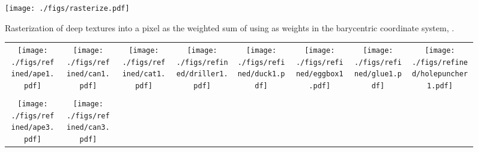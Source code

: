 \documentclass[10pt,twocolumn,letterpaper]{article}
\begin{document}
\begin{figure}[t]
  \centering
  \texttt{[image: ./figs/rasterize.pdf]}
  \caption{Rasterization of deep textures into a pixel  as the weighted sum of  using  as weights in the barycentric coordinate system, .}
  \label{fig:rasterize}
\end{figure}

\begin{figure*}
\begin{center}
\hspace*{-0.5cm}
\begin{tabular}{cccccccc}
  \begin{minipage}{0.10\linewidth}
    \texttt{[image: ./figs/refined/ape1.pdf]}
  \end{minipage} &
  \begin{minipage}{0.10\linewidth}
    \texttt{[image: ./figs/refined/can1.pdf]}
  \end{minipage} &
  \begin{minipage}{0.10\linewidth}
    \texttt{[image: ./figs/refined/cat1.pdf]}
  \end{minipage} &
  \begin{minipage}{0.10\linewidth}
    \texttt{[image: ./figs/refined/driller1.pdf]}
  \end{minipage} &
  \begin{minipage}{0.10\linewidth}
    \texttt{[image: ./figs/refined/duck1.pdf]}
  \end{minipage} &
  \begin{minipage}{0.10\linewidth}
    \texttt{[image: ./figs/refined/eggbox1.pdf]}
  \end{minipage} & 
  \begin{minipage}{0.10\linewidth}
    \texttt{[image: ./figs/refined/glue1.pdf]}
  \end{minipage} &
  \begin{minipage}{0.10\linewidth}
    \texttt{[image: ./figs/refined/holepuncher1.pdf]}
  \end{minipage} \\ \\
    \begin{minipage}{0.10\linewidth}
    \texttt{[image: ./figs/refined/ape3.pdf]}
  \end{minipage} &
  \begin{minipage}{0.10\linewidth}
    \texttt{[image: ./figs/refined/can3.pdf]}
  \end{minipage} &

\end{tabular}
\end{center}
\end{figure*}
\end{document}
